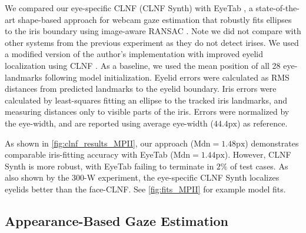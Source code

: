 We compared our eye-specific CLNF (CLNF Synth) with EyeTab \cite{wood2014eyetab}, a state-of-the-art shape-based approach for webcam gaze estimation that robustly fits ellipses to the iris boundary using image-aware RANSAC \cite{swirski2012robust}. Note we did not compare with other systems from the previous experiment as they do not detect irises.
We used a modified version of the author's implementation with improved eyelid localization using CLNF \cite{baltrusaitis2013constrained}.
As a baseline, we used the mean position of all 28 eye-landmarks following model initialization.
Eyelid errors were calculated as RMS distances from predicted landmarks to the eyelid boundary.
Iris errors were calculated by least-squares fitting an ellipse to the tracked iris landmarks, and measuring distances only to visible parts of the iris.
Errors were normalized by the eye-width, and are reported using average eye-width ($44.4\textrm{px}$) as reference.

As shown in \autoref{fig:clnf_results_MPII}, our approach ($\textrm{Mdn}\!=\!1.48\textrm{px}$) demonstrates comparable iris-fitting accuracy with EyeTab ($\textrm{Mdn}\!=\!1.44\textrm{px}$).
However, CLNF Synth is more robust, with EyeTab failing to terminate in $2\%$ of test cases.
As also shown by the 300-W experiment, the eye-specific CLNF Synth localizes eyelids better than the face-CLNF.
See \autoref{fig:fits_MPII} for example model fits.



\subsection{Appearance-Based Gaze Estimation}

